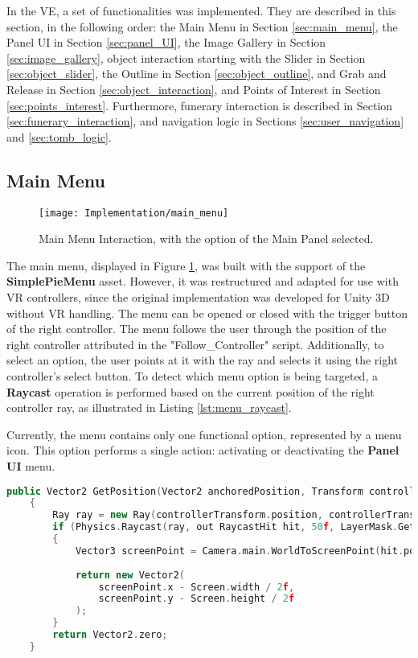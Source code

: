 In the \gls{VE}, a set of functionalities was implemented. 
They are described in this section, in the following order: the Main Menu in Section \ref{sec:main_menu}, the Panel \gls{UI} in Section \ref{sec:panel_UI}, the Image Gallery in Section \ref{sec:image_gallery}, object interaction starting with the Slider in Section \ref{sec:object_slider}, the Outline in Section \ref{sec:object_outline}, and Grab and Release in Section \ref{sec:object_interaction}, and Points of Interest in Section \ref{sec:points_interest}. 
Furthermore, funerary interaction is described in Section \ref{sec:funerary_interaction}, and navigation logic in Sections \ref{sec:user_navigation} and \ref{sec:tomb_logic}.

\subsection*{Main Menu}
\label{sec:main_menu}

 \begin{figure}[h!]
    \centering
    \texttt{[image: Implementation/main\_menu]}
    \caption{Main Menu Interaction, with the option of the Main Panel selected.}
    \label{fig:main_menu}
\end{figure}

The main menu, displayed in Figure \ref{fig:main_menu}, was built with the support of the \textbf{SimplePieMenu} asset.
However, it was restructured and adapted for use with \gls{VR} controllers, since the original implementation was developed for Unity \gls{3D} without \gls{VR} handling.
The menu can be opened or closed with the trigger button of the right controller. The menu follows the user through the position of the right controller attributed in the "Follow\_Controller" script.
Additionally, to select an option, the user points at it with the ray and selects it using the right controller’s select button. To detect which menu option is being targeted, a \textbf{Raycast} operation is performed based on the current position of the right controller ray, as illustrated in Listing \ref{lst:menu_raycast}.

Currently, the menu contains only one functional option, represented by a menu icon. This option performs a single action: activating or deactivating the \textbf{Panel \gls{UI}} menu.

\begin{lstlisting}[language=C++, caption={Method used to get the position that was pointed by the controller ray.}, label={lst:menu_raycast}]
    public Vector2 GetPosition(Vector2 anchoredPosition, Transform controllerTransform)
    {
        Ray ray = new Ray(controllerTransform.position, controllerTransform.forward);
        if (Physics.Raycast(ray, out RaycastHit hit, 50f, LayerMask.GetMask("Default")))
        {
            Vector3 screenPoint = Camera.main.WorldToScreenPoint(hit.point);
            
            return new Vector2(
                screenPoint.x - Screen.width / 2f,
                screenPoint.y - Screen.height / 2f
            );
        }
        return Vector2.zero;
    }
\end{lstlisting}



